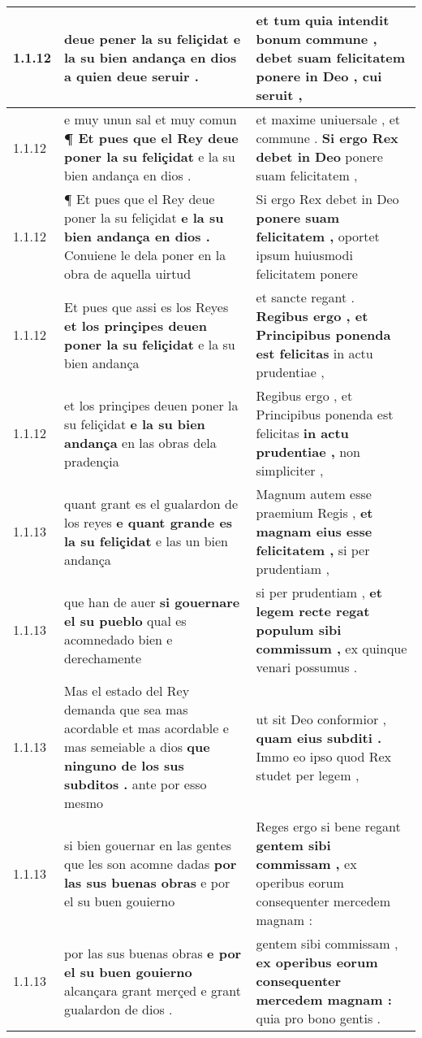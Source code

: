 \begin{tabular}{|p{1cm}|p{6.5cm}|p{6.5cm}|}
1.1.12 & deue pener la su feliçidat \textbf{ e la su bien andança en dios } a quien deue seruir . & et tum quia intendit bonum commune , \textbf{ debet suam felicitatem ponere in Deo , } cui seruit , \\\hline
1.1.12 & e muy unun sal et muy comun \textbf{ ¶ Et pues que el Rey deue poner la su feliçidat } e la su bien andança en dios . & et maxime uniuersale , et commune . \textbf{ Si ergo Rex debet in Deo } ponere suam felicitatem , \\\hline
1.1.12 & ¶ Et pues que el Rey deue poner la su feliçidat \textbf{ e la su bien andança en dios . } Conuiene le dela poner en la obra de aquella uirtud & Si ergo Rex debet in Deo \textbf{ ponere suam felicitatem , } oportet ipsum huiusmodi felicitatem ponere \\\hline
1.1.12 & Et pues que assi es los Reyes \textbf{ et los prinçipes deuen poner la su feliçidat } e la su bien andança & et sancte regant . \textbf{ Regibus ergo , et Principibus ponenda est felicitas } in actu prudentiae , \\\hline
1.1.12 & et los prinçipes deuen poner la su feliçidat \textbf{ e la su bien andança } en las obras dela pradençia & Regibus ergo , et Principibus ponenda est felicitas \textbf{ in actu prudentiae , } non simpliciter , \\\hline
1.1.13 & quant grant es el gualardon de los reyes \textbf{ e quant grande es la su feliçidat } e las un bien andança & Magnum autem esse praemium Regis , \textbf{ et magnam eius esse felicitatem , } si per prudentiam , \\\hline
1.1.13 & que han de auer \textbf{ si gouernare el su pueblo } qual es acomnedado bien e derechamente & si per prudentiam , \textbf{ et legem recte regat populum sibi commissum , } ex quinque venari possumus . \\\hline
1.1.13 & Mas el estado del Rey demanda que sea mas acordable et mas acordable e mas semeiable a dios \textbf{ que ninguno de los sus subditos . } ante por esso mesmo & ut sit Deo conformior , \textbf{ quam eius subditi . } Immo eo ipso quod Rex studet per legem , \\\hline
1.1.13 & si bien gouernar en las gentes que les son acomne dadas \textbf{ por las sus buenas obras } e por el su buen gouierno & Reges ergo si bene regant \textbf{ gentem sibi commissam , } ex operibus eorum consequenter mercedem magnam : \\\hline
1.1.13 & por las sus buenas obras \textbf{ e por el su buen gouierno } alcançara grant merçed e grant gualardon de dios . & gentem sibi commissam , \textbf{ ex operibus eorum consequenter mercedem magnam : } quia pro bono gentis . \\\hline

\end{tabular}
